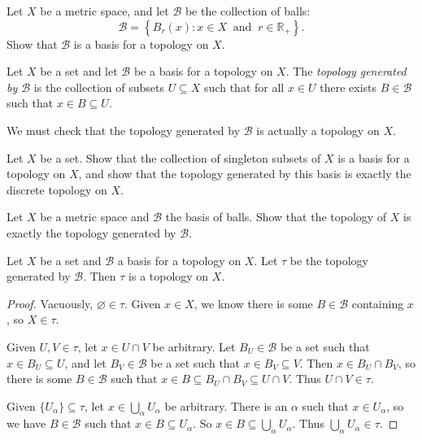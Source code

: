 \documentclass[a4paper,11pt]{article}
\begin{document}
    \begin{exercise}
      Let \(X\) be a metric space, and let \(\mathcal{B}\) be the collection of balls:
      \[
        \mathcal{B} = \left\{ B_r(x) : x \in X\ \text{ and }\ r \in \mathbb{R}_+ \right\}.
      \]
      Show that \(\mathcal{B}\) is a basis for a topology on \(X\).
    \end{exercise}

    \begin{definition}
      Let \(X\) be a set and let \(\mathcal{B}\) be a basis for a topology on \(X\). The \emph{topology generated by \(\mathcal{B}\)} is the collection of subsets \(U \subseteq X\) such that for all \(x \in U\) there exists \(B \in \mathcal{B}\) such that \(x \in B \subseteq U\).
    \end{definition}
    We must check that the topology generated by \(\mathcal{B}\) is actually a topology on \(X\).

    \begin{exercise}
      Let \(X\) be a set. Show that the collection of singleton subsets of \(X\) is a basis for a topology on \(X\), and show that the topology generated by this basis is exactly the discrete topology on \(X\).
    \end{exercise}

    \begin{exercise}
      Let \(X\) be a metric space and \(\mathcal{B}\) the basis of balls. Show that the topology of \(X\) is exactly the topology generated by \(\mathcal{B}\).
    \end{exercise}

    \begin{proposition}
      Let \(X\) be a set and \(\mathcal{B}\) a basis for a topology on \(X\). Let \(\tau\) be the topology generated by \(\mathcal{B}\). Then \(\tau\) is a topology on \(X\).
    \end{proposition}
    \begin{proof}
      Vacuously, \(\varnothing \in \tau\). Given \(x \in X\), we know there is some \(B \in \mathcal{B}\) containing \(x\), so \(X \in \tau\).

      Given \(U,V \in \tau\), let \(x \in U \cap V\) be arbitrary. Let \(B_U \in \mathcal{B}\) be a set such that \(x \in B_U \subseteq U\), and let \(B_V \in \mathcal{B}\) be a set such that \(x \in B_V \subseteq V\). Then \(x \in B_U \cap B_V\), so there is some \(B \in \mathcal{B}\) such that \(x \in B \subseteq B_U \cap B_V \subseteq U \cap V\). Thus \(U \cap V \in \tau\).

      Given \(\{U_\alpha\} \subseteq \tau\), let \(x \in \bigcup_\alpha U_\alpha\) be arbitrary. There is an \(\alpha\) such that \(x \in U_\alpha\), so we have \(B \in \mathcal{B}\) such that \(x \in B \subseteq U_\alpha\). So \(x \in B \subseteq \bigcup_\alpha U_\alpha\). Thus \(\bigcup_\alpha U_\alpha \in \tau\).
    \end{proof}
\end{document}
